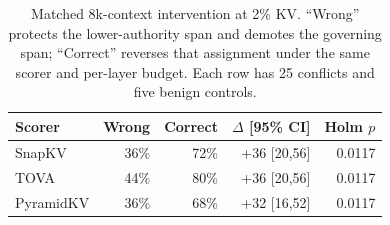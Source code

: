\begin{table}[t]
\centering
\small
\setlength{\tabcolsep}{3pt}
\begin{tabular}{lrrrr}
\toprule
Scorer & Wrong & Correct & $\Delta$ [95\% CI] & Holm $p$ \\
\midrule
SnapKV & 36\% & 72\% & +36 [20,56] & 0.0117 \\
TOVA & 44\% & 80\% & +36 [20,56] & 0.0117 \\
PyramidKV & 36\% & 68\% & +32 [16,52] & 0.0117 \\
\bottomrule
\end{tabular}
\caption{Matched 8k-context intervention at 2\% KV. ``Wrong'' protects the lower-authority span and demotes the governing span; ``Correct'' reverses that assignment under the same scorer and per-layer budget. Each row has 25 conflicts and five benign controls.}
\label{tab:matched-causal}
\end{table}

